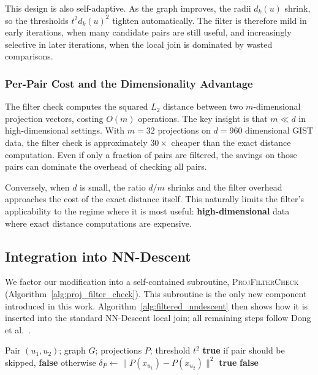This design is also self-adaptive. As the graph improves, the radii $d_k(u)$ shrink, so the thresholds $t^2 d_k(u)^2$ tighten automatically. The filter is therefore mild in early iterations, when many candidate pairs are still useful, and increasingly selective in later iterations, when the local join is dominated by wasted comparisons.

\subsubsection{Per-Pair Cost and the Dimensionality Advantage}

The filter check computes the squared $L_2$ distance between two $m$-dimensional projection vectors, costing $O(m)$ operations. The key insight is that $m \ll d$ in high-dimensional settings. With $m = 32$ projections on $d = 960$ dimensional GIST data, the filter check is approximately $30\times$ cheaper than the exact distance computation. Even if only a fraction of pairs are filtered, the savings on those pairs can dominate the overhead of checking all pairs.

Conversely, when $d$ is small, the ratio $d / m$ shrinks and the filter overhead approaches the cost of the exact distance itself. This naturally limits the filter's applicability to the regime where it is most useful: \textbf{high-dimensional} data where exact distance computations are expensive.


\subsection{Integration into NN-Descent}
\label{sec:integration}

We factor our modification into a self-contained subroutine, \textsc{ProjFilterCheck} (Algorithm~\ref{alg:proj_filter_check}). This subroutine is the only new component introduced in this work. Algorithm~\ref{alg:filtered_nndescent} then shows how it is inserted into the standard NN-Descent local join; all remaining steps follow Dong et al.~\cite{dong2011}.

\begin{algorithm}[t]
\caption{\textsc{ProjFilterCheck} --- projection-based filtering subroutine (ours)}
\label{alg:proj_filter_check}
\begin{algorithmic}
\small
\Require Pair $(u_1, u_2)$; graph $G$; projections $P$; threshold $t^2$
\Ensure \textbf{true} if pair should be skipped, \textbf{false} otherwise
\State $\delta_P \gets \|P(x_{u_1}) - P(x_{u_2})\|^2$ 
 
    \State \Return \textbf{true}
\EndIf
\State \Return \textbf{false}
\end{algorithmic}
\end{algorithm}

